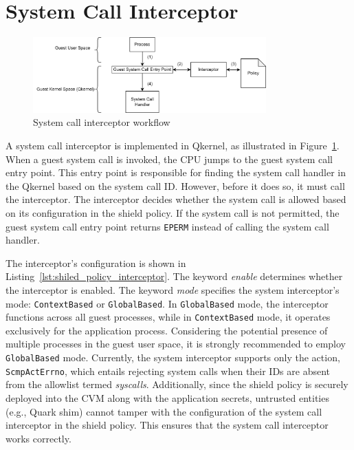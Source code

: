 \section{System Call Interceptor}
\label{sec:design_Interceptor}
\begin{figure}[!htb]
    \centering
    \includegraphics[width=0.8\textwidth]{images/syscall_interceptor.png}
    \caption[System call interceptor workflow]{System call interceptor workflow}
    \label{fig:syscall_interceptor}
\end{figure}
A system call interceptor is implemented in Qkernel, as illustrated in Figure~\ref{fig:syscall_interceptor}. When a guest system call is invoked, the CPU jumps to the guest system call entry point. This entry point is responsible for finding the system call handler in the Qkernel based on the system 
call ID. However, before it does so, it must call the interceptor. The interceptor decides whether the system call is allowed based on its configuration in the shield policy. If the system call is not permitted, the guest system call entry point returns \texttt{EPERM} instead of calling the 
system call handler. 

The interceptor's configuration is shown in Listing~\ref{lst:shiled_policy_interceptor}. The keyword \emph{enable} determines whether the interceptor is enabled. The keyword \emph{mode} specifies the system interceptor's mode: \texttt{ContextBased} or \texttt{GlobalBased}. In \texttt{GlobalBased} mode, the interceptor 
functions across all guest processes, while in \texttt{ContextBased} mode, it operates exclusively for the application process. Considering the potential presence of multiple processes in the guest user space, it is strongly recommended to employ \texttt{GlobalBased} mode. Currently, the system 
interceptor supports only the action, \texttt{ScmpActErrno}, which entails rejecting system calls when their IDs are absent from the allowlist termed \emph{syscalls}. Additionally, since the shield policy is securely deployed into the \acrshort{CVM} along with the application secrets, 
untrusted entities (e.g., Quark shim) cannot tamper with the configuration of the system call interceptor in the shield policy. This ensures that the system call interceptor works correctly.

